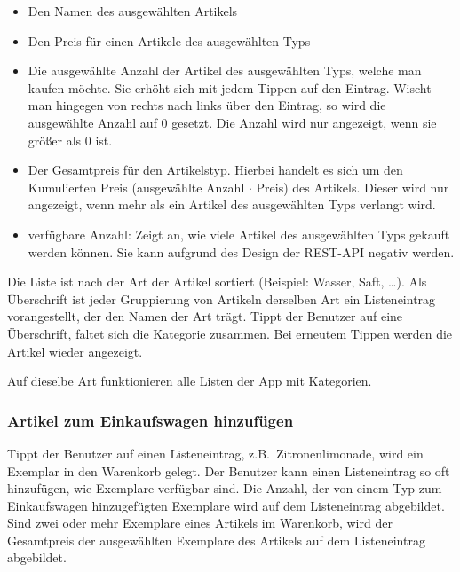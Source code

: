 \begin{itemize}
	\item Den Namen des ausgewählten Artikels

	\item Den Preis für einen Artikele des ausgewählten Typs

	\item Die ausgewählte Anzahl der Artikel des ausgewählten Typs, welche man kaufen möchte.
	Sie erhöht sich mit jedem Tippen auf den Eintrag.
	Wischt man hingegen von rechts nach links über den Eintrag, so wird die ausgewählte Anzahl auf 0 gesetzt.
	Die Anzahl wird nur angezeigt, wenn sie größer als 0 ist.

	\item Der Gesamtpreis für den Artikelstyp.
	Hierbei handelt es sich um den Kumulierten Preis (ausgewählte Anzahl $\cdot$ Preis) des Artikels.
	Dieser wird nur angezeigt, wenn mehr als ein Artikel des ausgewählten Typs verlangt wird.

	\item verfügbare Anzahl: Zeigt an, wie viele Artikel des ausgewählten Typs gekauft werden können.
	Sie kann aufgrund des Design der REST-API negativ werden.
\end{itemize}

Die Liste ist nach der Art der Artikel sortiert (Beispiel: Wasser, Saft, \ldots).
Als Überschrift ist jeder Gruppierung von Artikeln derselben Art ein Listeneintrag vorangestellt, der den Namen der Art trägt.
Tippt der Benutzer auf eine Überschrift, faltet sich die Kategorie zusammen.
Bei erneutem Tippen werden die Artikel wieder angezeigt.

Auf dieselbe Art funktionieren alle Listen der App mit Kategorien.

\subsubsection{Artikel zum Einkaufswagen hinzufügen} \label{subsubsec:shoppingcart-add-item}

Tippt der Benutzer auf einen Listeneintrag, z.B.\ Zitronenlimonade, wird ein Exemplar in den Warenkorb gelegt.
Der Benutzer kann einen Listeneintrag so oft hinzufügen, wie Exemplare verfügbar sind.
Die Anzahl, der von einem Typ zum Einkaufswagen hinzugefügten Exemplare wird auf dem Listeneintrag abgebildet.
Sind zwei oder mehr Exemplare eines Artikels im Warenkorb, wird der Gesamtpreis der ausgewählten Exemplare des Artikels auf dem Listeneintrag abgebildet.

